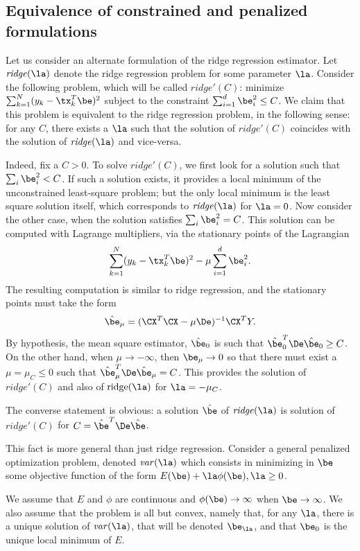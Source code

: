 \subsection{Equivalence of constrained and penalized formulations}
 
Let us consider an alternate formulation
of the ridge regression estimator. Let $\mathit{ridge}(\la)$ denote
the ridge regression problem for some parameter $\la$. Consider the
following problem, which will be called $\mathit{ridge}'(C)$:
minimize $\sum_{k=1}^N (y_k - \tx_k^T\be)^2$ subject to the constraint
$\sum_{i=1}^d \be_i^2 \leq C$. We claim that this problem is
equivalent to the ridge regression problem, in the following sense:
for any $C$, there exists a $\la$ such that the solution of
$\mathit{ridge}'(C)$ coincides with the solution of
$\mathit{ridge}(\la)$ and vice-versa. 

Indeed, fix a $C>0$. To solve $\mathit{ridge}'(C)$, we first look for
a solution such that $\sum_i \be_i^2 < C$. If such a solution exists,
it provides a local minimum of the unconstrained least-square problem; but the
only local minimum is the least square solution itself, which corresponds to 
$\mathit{ridge}(\la)$ for $\la=0$. Now consider the other case, when the solution
satisfies $\sum_i \be_i^2 = C$. This solution can be computed with
Lagrange multipliers, via the stationary
points of the Lagrangian
$$
\sum_{k=1}^N (y_k - \tx_k^T\be)^2 - \mu \sum_{i=1}^d \be_i^2.
$$
The resulting computation is similar to ridge regression, and the stationary points must take the
form
$$
\hat\be_\mu  = (\CX^T\CX -\mu \De)^{-1} \CX^T Y.
$$
By hypothesis, the mean square estimator, $\hat\be_0$ is such that
$\hat\be_0^T\De\hat\be_0 \geq C$. On the other hand, when $\mu \to
-\infty$, then $\be_\mu \to 0$ so that there must exist a $\mu = \mu_C
\leq 0$ such that $\hat \be_\mu^T\De\hat \be_\mu = C$. This provides the
solution of $\mathit{ridge}'(C)$ and also of $\text{ridge}(\la)$ for
$\la = -\mu_C$.

The converse statement is obvious: a solution $\hat\be$ of
$\mathit{ridge}(\la)$ is solution of $\mathit{ridge}'(C)$ for $C =
\hat\be^T \De\hat\be$. 

\bigskip

This fact is more general than just ridge regression. Consider a
general penalized optimization problem, denoted $\mathit{var}(\la)$
which consists in minimizing in $\be$ some objective function of the form $E(\be)
+ \la \phi(\be), \la \geq 0$. 

We assume that $E$ and $\phi$ are continuous and $\phi(\be) \to
\infty$ when $\be\to\infty$. We also assume that the problem is
all but convex, namely that, for any $\la$, there is a unique solution
of $\mathit{var}(\la)$, that will be denoted  $\be_\la$, and that $\be_0$ is the unique local minimum of $E$.


